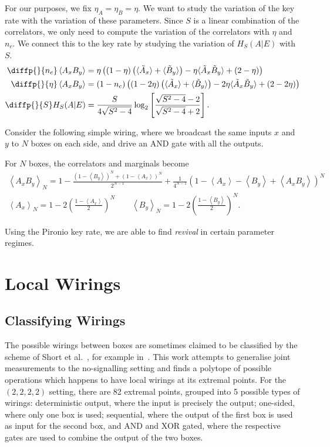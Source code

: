 \documentclass[10pt, a4paper]{article}
\newcommand{\?}{\mathrel{?}} %
\newcommand{\angleb}[1]{\left\langle #1 \right\rangle} %
\numberwithin{equation}{section} %
\theoremstyle{definition}
\theoremstyle{plain}
\theoremstyle{plain}
\begin{document}
    For our purposes, we fix \(\eta_A = \eta_B = \eta\). We want to study the variation of the key rate with the variation of these parameters. Since \(S\) is a linear combination of the correlators, we only need to compute the variation of the correlators with \(\eta\) and \(n_c\). We connect this to the key rate by studying the variation of \(H_S(A|E)\) with \(S\).
    \begin{align*}
      \diffp{}{{n_c}} \angleb{A_x B_y} &= \eta \left( \left(1-\eta\right) \left(\langle\tilde{A}_x\rangle + \langle\tilde{B}_y\rangle\right) - \eta \langle\tilde{A}_x\tilde{B}_y\rangle + \left(2 - \eta\right) \right) \\
      \diffp{}{{\eta}} \angleb{A_x B_y} &= \left(1 - n_{c}\right) \left( \left(1-2\eta\right) \left(\langle\tilde{A}_x\rangle+\langle\tilde{B}_y\rangle\right) - 2\eta \langle\tilde{A}_x\tilde{B}_y\rangle + (2-2\eta) \right) \\
      \diffp{}{S} H_S(A|E) &= \frac{S}{4\sqrt{S^2-4}} \log_2 \left[ \frac{\sqrt{S^2-4}-2}{\sqrt{S^2-4}+2} \right].
    \end{align*}

    Consider the following simple wiring, where we broadcast the same inputs \(x\) and \(y\) to \(N\) boxes on each side, and drive an AND gate with all the outputs.

    For \(N\) boxes, the correlators and marginals become
    \begin{gather}
      \angleb{A_x B_y}_{N} = 1 - \frac{{(1-\angleb{B_y})}^N + {(1-\angleb{A_x})}^N}{2^{N-1}} + \frac{1}{4^{N-1}} {(1-\angleb{A_x} - \angleb{B_y} + \angleb{A_x B_y})}^{N} \\
      \angleb{A_x}_{N} = 1 - 2 {\left(\frac{1-\angleb{A_x}}{2}\right)}^N \qquad \angleb{B_y}_{N} = 1 - 2 {\left(\frac{1-\angleb{B_y}}{2}\right)}^N.
    \end{gather}

    Using the Pironio key rate, we are able to find \emph{revival} in certain parameter regimes.

    \section{Local Wirings}

    \subsection{Classifying Wirings}

    The possible wirings between boxes are sometimes claimed to be classified by the scheme of Short et al.~\cite{ShortEntangleSwap}, for example in~\cite{ShortClassClaim}. This work attempts to generalise joint measurements to the no-signalling setting and finds a polytope of possible operations which happens to have local wirings at its extremal points. For the  \((2,2,2,2)\) setting, there are 82 extremal points, grouped into 5 possible types of wirings: deterministic output, where the input is precisely the output; one-sided, where only one box is used; sequential, where the output of the first box is used as input for the second box, and AND and XOR gated, where the respective gates are used to combine the output of the two boxes.
\end{document}
